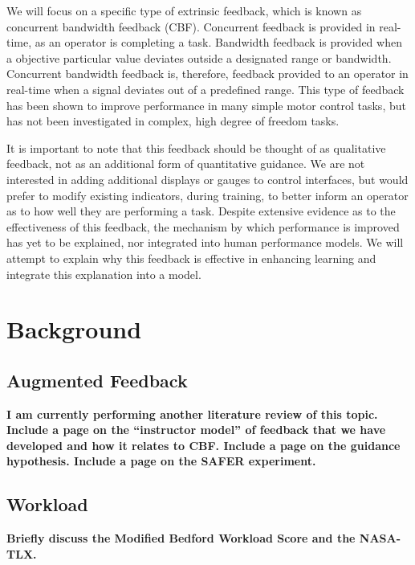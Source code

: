 We will focus on a specific type of extrinsic feedback, which is known as concurrent bandwidth feedback (CBF).
Concurrent feedback is provided in real-time, as an operator is completing a task.
Bandwidth feedback is provided when a objective particular value deviates outside a designated range or bandwidth.
Concurrent bandwidth feedback is, therefore, feedback provided to an operator in real-time when a signal deviates out of a predefined range.
This type of feedback has been shown to improve performance in many simple motor control tasks, but has not been investigated in complex, high degree of freedom tasks.

It is important to note that this feedback should be thought of as qualitative feedback, not as an additional form of quantitative guidance.
We are not interested in adding additional displays or gauges to control interfaces, but would prefer to modify existing indicators, during training, to better inform an operator as to how well they are performing a task.
Despite extensive evidence as to the effectiveness of this feedback, the mechanism by which performance is improved has yet to be explained, nor integrated into human performance models.
We will attempt to explain why this feedback is effective in enhancing learning and integrate this explanation into a model.

\section{Background}

\subsection{Augmented Feedback}
\textbf{\color{red} I am currently performing another literature review of this topic.
    Include a page on the ``instructor model'' of feedback that we have developed and how it relates to CBF.
    Include a page on the guidance hypothesis.
    Include a page on the SAFER experiment.}

\subsection{Workload}
\textbf{\color{red} Briefly discuss the Modified Bedford Workload Score and the NASA-TLX.}

